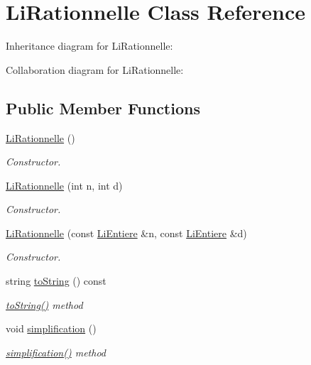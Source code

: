 \hypertarget{class_li_rationnelle}{}\section{Li\+Rationnelle Class Reference}
\label{class_li_rationnelle}


Inheritance diagram for Li\+Rationnelle\+:


Collaboration diagram for Li\+Rationnelle\+:
\subsection*{Public Member Functions}
\begin{DoxyCompactItemize}
\item 
\hyperlink{class_li_rationnelle_ac88e880e6f08aebfb25e01d8aec740ba}{Li\+Rationnelle} ()
\begin{DoxyCompactList}\small\item\em Constructor. \end{DoxyCompactList}\item 
\hyperlink{class_li_rationnelle_aa8189c481d2f595c7c13ad8e0683cf3c}{Li\+Rationnelle} (int n, int d)
\begin{DoxyCompactList}\small\item\em Constructor. \end{DoxyCompactList}\item 
\hyperlink{class_li_rationnelle_a729eafaf83c01bd5a5d20c0d1cfd7d83}{Li\+Rationnelle} (const \hyperlink{class_li_entiere}{Li\+Entiere} \&n, const \hyperlink{class_li_entiere}{Li\+Entiere} \&d)
\begin{DoxyCompactList}\small\item\em Constructor. \end{DoxyCompactList}\item 
string \hyperlink{class_li_rationnelle_a2ef7aa4c19e3433794c251cc61296f58}{to\+String} () const 
\begin{DoxyCompactList}\small\item\em \hyperlink{class_li_rationnelle_a2ef7aa4c19e3433794c251cc61296f58}{to\+String()} method \end{DoxyCompactList}\item 
void \hyperlink{class_li_rationnelle_a1b96a094c77eb02f6b0728751a10648e}{simplification} ()
\begin{DoxyCompactList}\small\item\em \hyperlink{class_li_rationnelle_a1b96a094c77eb02f6b0728751a10648e}{simplification()} method \end{DoxyCompactList}\item 

\end{DoxyCompactItemize}
